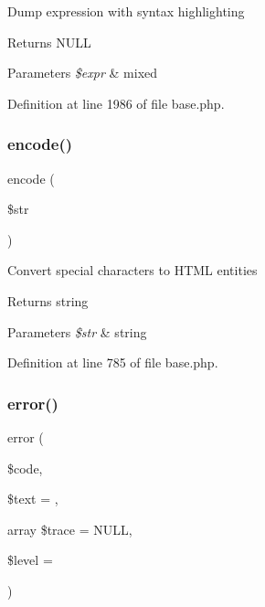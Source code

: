 Dump expression with syntax highlighting \begin{DoxyReturn}{Returns}
N\+U\+LL 
\end{DoxyReturn}

\begin{DoxyParams}{Parameters}
{\em \$expr} & mixed \\
\hline
\end{DoxyParams}


Definition at line 1986 of file base.\+php.

\hypertarget{class_base_a27ad9a200330b2a3e71f8fa5df0f3397}{}\label{class_base_a27ad9a200330b2a3e71f8fa5df0f3397} 
\subsubsection{\texorpdfstring{encode()}{encode()}}
{\footnotesize\ttfamily encode (\begin{DoxyParamCaption}\item[{}]{\$str }\end{DoxyParamCaption})}

Convert special characters to H\+T\+ML entities \begin{DoxyReturn}{Returns}
string 
\end{DoxyReturn}

\begin{DoxyParams}{Parameters}
{\em \$str} & string \\
\hline
\end{DoxyParams}


Definition at line 785 of file base.\+php.

\hypertarget{class_base_aa73cf9e2c791864c9baf4c2d55b5f68b}{}\label{class_base_aa73cf9e2c791864c9baf4c2d55b5f68b} 
\subsubsection{\texorpdfstring{error()}{error()}}
{\footnotesize\ttfamily error (\begin{DoxyParamCaption}\item[{}]{\$code,  }\item[{}]{\$text = {\ttfamily \textquotesingle{}\textquotesingle{}},  }\item[{array}]{\$trace = {\ttfamily NULL},  }\item[{}]{\$level = {} }\end{DoxyParamCaption})}

